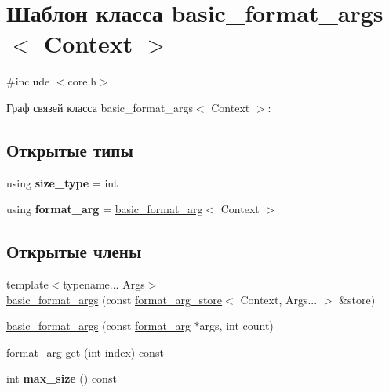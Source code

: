 \hypertarget{classbasic__format__args}{}\section{Шаблон класса basic\+\_\+format\+\_\+args$<$ Context $>$}
\label{classbasic__format__args}


{\ttfamily \#include $<$core.\+h$>$}



Граф связей класса basic\+\_\+format\+\_\+args$<$ Context $>$\+:
\subsection*{Открытые типы}
\begin{DoxyCompactItemize}
\item 
\mbox{\label{classbasic__format__args_a7569a8c7f913b1f906619701ab3150e6}} 
using {\bfseries size\+\_\+type} = int
\item 
\mbox{\label{classbasic__format__args_af22c7ecd69cc9c3dc2a9a113b5ff5088}} 
using {\bfseries format\+\_\+arg} = \hyperlink{classbasic__format__arg}{basic\+\_\+format\+\_\+arg}$<$ Context $>$
\end{DoxyCompactItemize}
\subsection*{Открытые члены}
\begin{DoxyCompactItemize}
\item 
{\footnotesize template$<$typename... Args$>$ }\\\hyperlink{classbasic__format__args_aff6e7b681609f33b18afb00281259ce2}{basic\+\_\+format\+\_\+args} (const \hyperlink{classformat__arg__store}{format\+\_\+arg\+\_\+store}$<$ Context, Args... $>$ \&store)
\item 
\hyperlink{classbasic__format__args_a6d735ccb56f6c4f64ba1199f223c8a6b}{basic\+\_\+format\+\_\+args} (const \hyperlink{classbasic__format__arg}{format\+\_\+arg} $\ast$args, int count)
\item 
\hyperlink{classbasic__format__arg}{format\+\_\+arg} \hyperlink{classbasic__format__args_aeddde6f5786c567b2054a6cf7f6c1876}{get} (int index) const
\item 
\mbox{\label{classbasic__format__args_a05543f32ef2b5278e60464b1b9e6a183}} 
int {\bfseries max\+\_\+size} () const
\end{DoxyCompactItemize}
